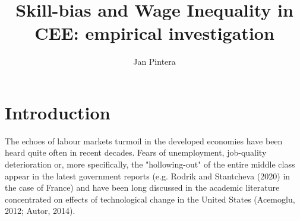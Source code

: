 \documentclass{article}
\title{Skill-bias and Wage Inequality in CEE: empirical investigation}
\author{Jan Pintera}
\date{}
\begin{document}
\maketitle
\section{Introduction}
The echoes of labour markets turmoil in the developed economies have been heard quite often in recent decades. Fears of unemployment, job-quality deterioration or, more specifically, the "hollowing-out" of the entire middle class appear in the latest government reports (e.g. Rodrik and Stantcheva (2020) in the case of France) and have been long discussed in the academic literature concentrated on effects of technological change in the United States (Acemoglu, 2012; Autor, 2014).
\end{document}
